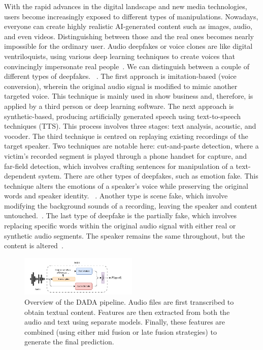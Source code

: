 \documentclass{Interspeech}
\begin{document}
With the rapid advances in the digital landscape and new media technologies,
users become increasingly exposed to different types of manipulations.
Nowadays, everyone can create highly realistic AI-generated content such as
images, audio, and even videos. Distinguishing between those and the real ones
becomes nearly impossible for the ordinary user. Audio deepfakes or voice
clones are like digital ventriloquists, using various deep learning techniques
to create voices that convincingly impersonate real people~\cite{adversarial}.
We can distinguish between a couple of different types of deepfakes.
~\cite{review_audio_deepfake_issues}. The first approach is imitation-based
(voice conversion), wherein the original audio signal is modified to mimic
another targeted voice. This technique is mainly used in show business and,
therefore, is applied by a third person or deep learning software. The next
approach is synthetic-based, producing artificially generated speech using
text-to-speech techniques (TTS). This process involves three stages: text
analysis, acoustic, and vocoder. The third technique is centred on replaying
existing recordings of the target speaker. Two techniques are notable here:
cut-and-paste detection, where a victim's recorded segment is played through a
phone handset for capture, and far-field detection, which involves crafting
sentences for manipulation of a text-dependent system. There are other types of
deepfakes, such as emotion fake. This technique alters the emotions of a
speaker's voice while preserving the original words and speaker identity.
~\cite{zhao2023emofake}. Another type is scene fake, which involve modifying
the background sounds of a recording, leaving the speaker and content
untouched.~\cite{yi2022scenefake}. The last type of deepfake is the partially
fake, which involves replacing specific words within the original audio signal
with either real or synthetic audio segments. The speaker remains the same
throughout, but the content is altered~\cite{yi2023halftruth}.

\begin{figure}[t]
  \centering
    \includegraphics[width=0.5\textwidth]{figures/overview.pdf}
    \caption{Overview of the DADA pipeline. Audio files are first transcribed to obtain textual content. Features are then extracted from both the audio and text using separate models. Finally, these features are combined (using either mid fusion or late fusion strategies) to generate the final prediction.}\label{fig:overview}
  \end{figure}
\end{document}
